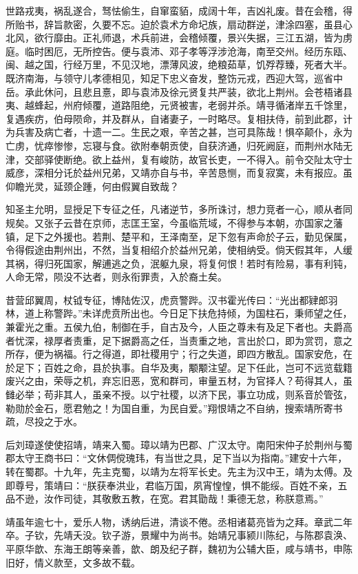 \documentclass[12pt,UTF8]{ctexbook}
\begin{document}
世路戎夷，祸乱遂合，驽怯偷生，自窜蛮貊，成阔十年，吉凶礼废。昔在会稽，得所贻书，辞旨款密，久要不忘。迫於袁术方命圮族，扇动群逆，津涂四塞，虽县心北风，欲行靡由。正礼师退，术兵前进，会稽倾覆，景兴失据，三江五湖，皆为虏庭。临时困厄，无所控告。便与袁沛、邓子孝等浮涉沧海，南至交州。经历东瓯、闽、越之国，行经万里，不见汉地，漂薄风波，绝粮茹草，饥殍荐臻，死者大半。既济南海，与领守儿孝德相见，知足下忠义奋发，整饬元戎，西迎大驾，巡省中岳。承此休问，且悲且憙，即与袁沛及徐元贤复共严装，欲北上荆州。会苍梧诸县夷、越蜂起，州府倾覆，道路阻绝，元贤被害，老弱并杀。靖寻循渚岸五千馀里，复遇疾疠，伯母陨命，并及群从，自诸妻子，一时略尽。复相扶侍，前到此郡，计为兵害及病亡者，十遗一二。生民之艰，辛苦之甚，岂可具陈哉！惧卒颠仆，永为亡虏，忧瘁惨惨，忘寝与食。欲附奉朝贡使，自获济通，归死阙庭，而荆州水陆无津，交部驿使断绝。欲上益州，复有峻防，故官长吏，一不得入。前令交阯太守士威彦，深相分讬於益州兄弟，又靖亦自与书，辛苦恳恻，而复寂寞，未有报应。虽仰瞻光灵，延颈企踵，何由假翼自致哉？

知圣主允明，显授足下专征之任，凡诸逆节，多所诛讨，想力竞者一心，顺从者同规矣。又张子云昔在京师，志匡王室，今虽临荒域，不得参与本朝，亦国家之藩镇，足下之外援也。若荆、楚平和，王泽南至，足下忽有声命於子云，勤见保属，令得假途由荆州出，不然，当复相绍介於益州兄弟，使相纳受。倘天假其年，人缓其祸，得归死国家，解逋逃之负，泯躯九泉，将复何恨！若时有险易，事有利钝，人命无常，陨没不达者，则永衔罪责，入於裔土矣。

昔营邱翼周，杖钺专征，博陆佐汉，虎贲警跸。汉书霍光传曰：“光出都肄郎羽林，道上称警跸。”未详虎贲所出也。今日足下扶危持倾，为国柱石，秉师望之任，兼霍光之重。五侯九伯，制御在手，自古及今，人臣之尊未有及足下者也。夫爵高者忧深，禄厚者责重，足下据爵高之任，当责重之地，言出於口，即为赏罚，意之所存，便为祸福。行之得道，即社稷用宁；行之失道，即四方散乱。国家安危，在於足下；百姓之命，县於执事。自华及夷，颙颙注望。足下任此，岂可不远览载籍废兴之由，荣辱之机，弃忘旧恶，宽和群司，审量五材，为官择人？苟得其人，虽雠必举；苟非其人，虽亲不授。以宁社稷，以济下民，事立功成，则系音於管弦，勒勋於金石，愿君勉之！为国自重，为民自爱。”翔恨靖之不自纳，搜索靖所寄书疏，尽投之于水。

后刘璋遂使使招靖，靖来入蜀。璋以靖为巴郡、广汉太守。南阳宋仲子於荆州与蜀郡太守王商书曰：“文休倜傥瑰玮，有当世之具，足下当以为指南。”建安十六年，转在蜀郡。十九年，先主克蜀，以靖为左将军长史。先主为汉中王，靖为太傅。及即尊号，策靖曰：“朕获奉洪业，君临万国，夙宵惶惶，惧不能绥。百姓不亲，五品不逊，汝作司徒，其敬敷五教，在宽。君其勖哉！秉德无怠，称朕意焉。”

靖虽年逾七十，爱乐人物，诱纳后进，清谈不倦。丞相诸葛亮皆为之拜。章武二年卒。子钦，先靖夭没。钦子游，景耀中为尚书。始靖兄事颍川陈纪，与陈郡袁涣、平原华歆、东海王朗等亲善，歆、朗及纪子群，魏初为公辅大臣，咸与靖书，申陈旧好，情义款至，文多故不载。
\end{document}
